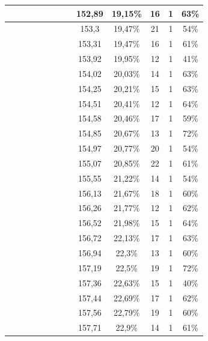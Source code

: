 \begin{center}
\begin{longtable}{|c|c|c|c|c|c|c|c|c|c|c|c|c|}
 \x &  \x &  \x &  &  \x &  &  \x &  & 152,89 & 19,15\% & 16 & 1 & 63\% \\ \hline
 \x &  \x &  &  &  &  &  \x &  & 153,3 & 19,47\% & 21 & 1 & 54\% \\ \hline
 \x &  \x &  &  &  \x &  &  \x &  & 153,31 & 19,47\% & 16 & 1 & 61\% \\ \hline
 \x &  &  &  &  &  &  \x &  & 153,92 & 19,95\% & 12 & 1 & 41\% \\ \hline
 \x &  &  \x &  \x &  &  &  &  & 154,02 & 20,03\% & 14 & 1 & 63\% \\ \hline
 \x &  \x &  \x &  \x &  \x &  &  &  \x & 154,25 & 20,21\% & 15 & 1 & 63\% \\ \hline
 \x &  \x &  \x &  &  \x &  &  \x &  \x & 154,51 & 20,41\% & 12 & 1 & 64\% \\ \hline
 \x &  &  &  &  \x &  &  \x &  & 154,58 & 20,46\% & 17 & 1 & 59\% \\ \hline
 \x &  \x &  &  &  &  \x &  \x &  & 154,85 & 20,67\% & 13 & 1 & 72\% \\ \hline
 \x &  \x &  &  \x &  &  &  \x &  & 154,97 & 20,77\% & 20 & 1 & 54\% \\ \hline
 \x &  \x &  &  \x &  \x &  &  \x &  \x & 155,07 & 20,85\% & 22 & 1 & 61\% \\ \hline
 \x &  \x &  &  \x &  &  &  \x &  \x & 155,55 & 21,22\% & 14 & 1 & 54\% \\ \hline
 \x &  &  &  &  \x &  &  \x &  \x & 156,13 & 21,67\% & 18 & 1 & 60\% \\ \hline
 \x &  \x &  \x &  \x &  \x &  &  &  & 156,26 & 21,77\% & 12 & 1 & 62\% \\ \hline
 \x &  &  \x &  \x &  &  &  \x &  \x & 156,52 & 21,98\% & 15 & 1 & 64\% \\ \hline
 \x &  &  \x &  \x &  \x &  &  \x &  & 156,72 & 22,13\% & 17 & 1 & 63\% \\ \hline
 \x &  \x &  &  \x &  \x &  &  &  & 156,94 & 22,3\% & 13 & 1 & 60\% \\ \hline
 \x &  &  \x &  &  &  \x &  \x &  & 157,19 & 22,5\% & 19 & 1 & 72\% \\ \hline
 \x &  &  &  &  &  &  \x &  \x & 157,36 & 22,63\% & 15 & 1 & 40\% \\ \hline
 \x &  &  \x &  \x &  \x &  &  &  \x & 157,44 & 22,69\% & 17 & 1 & 62\% \\ \hline
 \x &  \x &  &  &  \x &  &  \x &  \x & 157,56 & 22,79\% & 19 & 1 & 60\% \\ \hline
 \x &  \x &  \x &  &  &  &  \x &  & 157,71 & 22,9\% & 14 & 1 & 61\% \\ \hline

\end{longtable}
\end{center}
